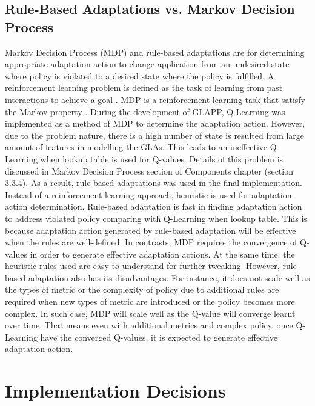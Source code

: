 \documentclass{seal_thesis}
\begin{document}
\subsection{Rule-Based Adaptations vs. Markov Decision Process}
Markov Decision Process (MDP) and rule-based adaptations are for determining appropriate adaptation action to change application from an undesired state where policy is violated to a desired state where the policy is fulfilled.
A reinforcement learning problem is defined as the task of learning from past interactions to achieve a goal .
MDP is a reinforcement learning task that satisfy the Markov property .
During the development of GLAPP, Q-Learning was implemented as a method of MDP to determine the adaptation action.
However, due to the problem nature, there is a high number of state is resulted from large amount of features in modelling the GLAs.
This leads to an ineffective Q-Learning when lookup table is used for Q-values.
Details of this problem is discussed in Markov Decision Process section of Components chapter (section 3.3.4).
As a result, rule-based adaptations was used in the final implementation.
Instead of a reinforcement learning approach, heuristic is used for adaptation action determination.
Rule-based adaptation is fast in finding adaptation action to address violated policy comparing with Q-Learning when lookup table.
This is because adaptation action generated by rule-based adaptation will be effective when the rules are well-defined.
In contrasts, MDP requires the convergence of Q-values in order to generate effective adaptation actions.
At the same time, the heuristic rules used are easy to understand for further tweaking.
However, rule-based adaptation also has its disadvantages.
For instance, it does not scale well as the types of metric or the complexity of policy due to additional rules are required when new types of metric are introduced or the policy becomes more complex.
In such case, MDP will scale well as the Q-value will converge learnt over time.
That means even with additional metrics and complex policy, once Q-Learning have the converged Q-values, it is expected to generate effective adaptation action.

\section{Implementation Decisions}
\end{document}
